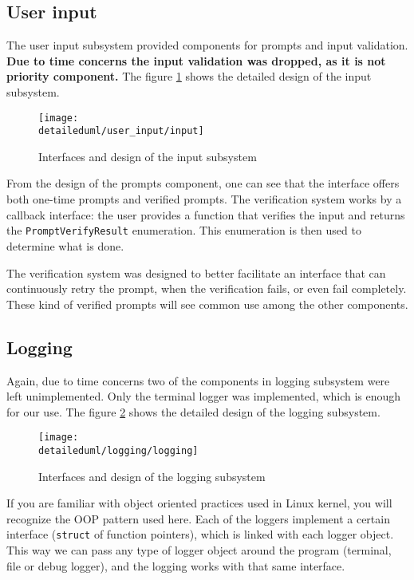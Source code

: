 \subsection{User input}

The user input subsystem provided components for prompts and input validation.
\textbf{Due to time concerns the input validation was dropped, as it is not
priority component.} The figure \ref{dia:prompts_design} shows the detailed
design of the input subsystem.

\begin{figure}[H]
    \centering
    \centerline{\texttt{[image: \\detaileduml/user\_input/input]}}
    \caption{Interfaces and design of the input subsystem}
    \label{dia:prompts_design}
\end{figure}

From the design of the prompts component, one can see that the interface offers
both one-time prompts and verified prompts. The verification system works by
a callback interface: the user provides a function that verifies the input and
returns the \texttt{PromptVerifyResult} enumeration. This enumeration is then
used to determine what is done.

The verification system was designed to better facilitate an interface that
can continuously retry the prompt, when the verification fails, or even fail
completely. These kind of verified prompts will see common use among the other
components.

\subsection{Logging}

Again, due to time concerns two of the components in logging subsystem were
left unimplemented. Only the terminal logger was implemented, which is enough
for our use. The figure \ref{dia:logging_design} shows the detailed design of
the logging subsystem.

\begin{figure}[H]
    \centering
    \centerline{\texttt{[image: \\detaileduml/logging/logging]}}
    \caption{Interfaces and design of the logging subsystem}
    \label{dia:logging_design}
\end{figure}

If you are familiar with object oriented practices used in Linux kernel, you
will recognize the OOP pattern used here. Each of the loggers implement a
certain interface (\texttt{struct} of function pointers), which is linked with
each logger object. This way we can pass any type of logger object around the
program (terminal, file or debug logger), and the logging works with that same
interface.
